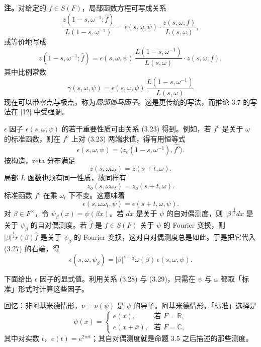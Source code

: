 \medskip\noindent\textbf{注。}\quad 对给定的 $f\in S(F)$，局部函数方程可写成关系
\begin{equation*}\tag{3.24}
\frac{z(1-s,\omega^{-1};\hat f)}{L(1-s,\omega^{-1})}
=\epsilon(s,\omega,\psi)\cdot\frac{z(s,\omega;f)}{L(s,\omega)},
\end{equation*}
或等价地写成
\begin{equation*}\tag{3.25}
z(1-s,\omega^{-1};\hat f)
=\epsilon(s,\omega,\psi)\,\frac{L(1-s,\omega^{-1})}{L(s,\omega)}\cdot z(s,\omega;f),
\end{equation*}
其中比例常数
\begin{equation*}\tag{3.26}
\gamma(s,\omega,\psi)=\epsilon(s,\omega,\psi)\,\frac{L(1-s,\omega^{-1})}{L(s,\omega)}
\end{equation*}
现在可以带零点与极点，称为\emph{局部伽马因子}。这是更传统的写法，而推论 3.7 的写法在 [12] 中受强调。

$\epsilon$ 因子 $\epsilon(s,\omega,\psi)$ 的若干重要性质可由关系 (3.23) 得到。例如，若 $f^o$ 是关于 $\omega$ 的标准函数，则在 $f^o$ 上对 (3.23) 两端求值，得有用恒等式
\begin{equation*}\tag{3.27}
\epsilon(s,\omega,\psi)=\langle z_o(1-s,\omega^{-1}),\widehat{f^o}\rangle.
\end{equation*}
按构造，zeta 分布满足
\[
z(s,\omega\omega_t)=z(s+t,\omega).
\]
局部 $L$ 函数也须有同一性质，故同样有
\[
z_o(s,\omega\omega_t)=z_o(s+t,\omega).
\]
标准函数 $f^o$ 在乘 $\omega_t$ 下不变。这意味着
\begin{equation*}\tag{3.28}
\epsilon(s,\omega\omega_t,\psi)=\epsilon(s+t,\omega,\psi).
\end{equation*}
对 $\beta\in F^\times$，令 $\psi_\beta(x)=\psi(\beta x)$。若 $dx$ 是关于 $\psi$ 的自对偶测度，则 $|\beta|^{\frac12}dx$ 是关于 $\psi_\beta$ 的自对偶测度。若 $\hat f$ 是 $f\in S(F)$ 关于 $\psi$ 的 Fourier 变换，则 $|\beta|^{\frac12}r(\beta)\hat f$ 是关于 $\psi_\beta$ 的 Fourier 变换，这对自对偶测度总是如此。于是把它代入 (3.27) 的右端，得
\begin{equation*}\tag{3.29}
\epsilon(s,\omega,\psi_\beta)=|\beta|^{s-\frac12}\omega(\beta)\,\epsilon(s,\omega,\psi).
\end{equation*}

下面给出 $\epsilon$ 因子的显式值。利用关系 (3.28) 与 (3.29)，只需在 $\psi$ 与 $\omega$ 都取「标准」形式时计算这些因子。

回忆：非阿基米德情形，$\nu=\nu(\psi)$ 是 $\psi$ 的导子。阿基米德情形，「标准」选择是
\begin{equation*}\tag{3.30}
\psi(x)=
\begin{cases}
e(x),&\text{若 }F=\mathbb R,\\
e(x+\bar x),&\text{若 }F=\mathbb C,
\end{cases}
\end{equation*}
其中对实数 $t$，$e(t)=e^{2\pi it}$；其自对偶测度就是命题 3.5 之后描述的那些测度。

